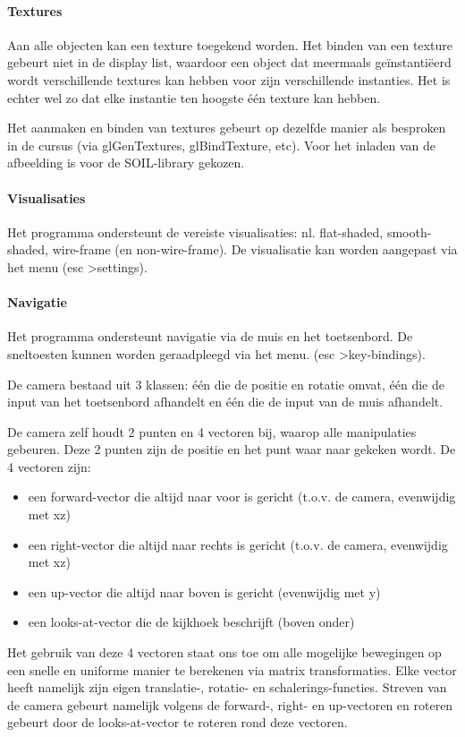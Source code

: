 \documentclass{article}
\begin{document}
\paragraph{Textures}Aan alle objecten kan een texture toegekend worden. Het binden van een texture gebeurt niet in de display list, waardoor een object dat meermaals geïnstantiëerd wordt verschillende textures kan hebben voor zijn verschillende instanties. Het is echter wel zo dat elke instantie ten hoogste één texture kan hebben.
\par
Het aanmaken en binden van textures gebeurt op dezelfde manier als besproken in de cursus (via glGenTextures, glBindTexture, etc). Voor het inladen van de afbeelding is voor de SOIL-library gekozen.

\paragraph{Visualisaties}Het programma ondersteunt de vereiste visualisaties: nl. flat-shaded, smooth-shaded, wire-frame (en non-wire-frame). De visualisatie kan worden aangepast via het menu (esc \textgreater \space settings).

\paragraph{Navigatie}Het programma ondersteunt navigatie via de muis en het toetsenbord. De sneltoesten kunnen worden geraadpleegd via het menu. (esc \textgreater \space key-bindings).
\par
De camera bestaad uit 3 klassen: één die de positie en rotatie omvat, één die de input van het toetsenbord afhandelt en één die de input van de muis afhandelt.
\par
De camera zelf houdt 2 punten en 4 vectoren bij, waarop alle manipulaties gebeuren. Deze 2 punten zijn de positie en het punt waar naar gekeken wordt. De 4 vectoren zijn:
\begin{itemize}
	\item een forward-vector die altijd naar voor is gericht (t.o.v. de camera, evenwijdig met xz)
	\item een right-vector die altijd naar rechts is gericht (t.o.v. de camera, evenwijdig met xz)
	\item een up-vector die altijd naar boven is gericht (evenwijdig met y)
	\item een looks-at-vector die de kijkhoek beschrijft (boven onder)
\end{itemize}
Het gebruik van deze 4 vectoren staat ons toe om alle mogelijke bewegingen op een snelle en uniforme manier te berekenen via matrix transformaties. Elke vector heeft namelijk zijn eigen translatie-, rotatie- en schalerings-functies. Streven van de camera gebeurt namelijk volgens de forward-, right- en up-vectoren en roteren gebeurt door de looks-at-vector te roteren rond deze vectoren.
\end{document}
